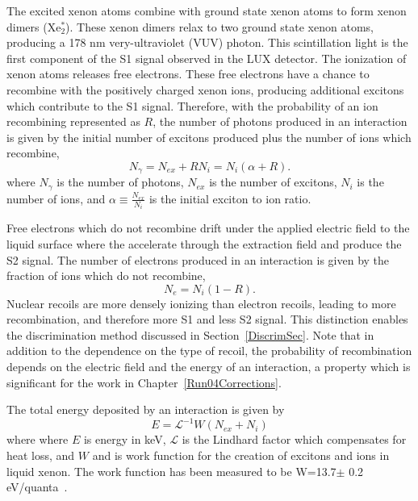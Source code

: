 The excited xenon atoms combine with ground state xenon atoms to form xenon dimers (Xe$^*_2$).  These xenon dimers relax to two ground state xenon atoms, producing a 178 nm very-ultraviolet (VUV) photon.  This scintillation light is the first component of the S1 signal observed in the LUX detector. The ionization of xenon atoms releases free electrons.  These free electrons have a chance to recombine with the positively charged xenon ions, producing additional excitons which contribute to the S1 signal. Therefore, with the probability of an ion recombining represented as $R$, the number of photons produced in an interaction is given by the initial number of excitons produced plus the number of ions which recombine,
\begin{equation}
N_\gamma = N_{ex} + R N_i = N_{i}  (\alpha + R).
\end{equation}
where $N_\gamma$ is the number of photons, $N_{ex}$ is the number of excitons, $N_i$ is the number of ions, and $\alpha \equiv \frac{N_{ex}}{N_i}$ is the initial exciton to ion ratio. 



Free electrons which do not recombine drift under the applied electric field to the liquid surface where the accelerate through the extraction field and produce the S2 signal.  The number of electrons produced in an interaction is given by the fraction of ions which do not recombine,
\begin{equation}
N_e = N_i(1-R).
\end{equation}
Nuclear recoils are more densely ionizing than electron recoils, leading to more recombination, and therefore more S1 and less S2 signal.  This distinction enables the discrimination method discussed in Section~\ref{DiscrimSec}.  Note that in addition to the dependence on the type of recoil, the probability of recombination depends on the electric field and the energy of an interaction, a property which is significant for the work in Chapter~\ref{Run04Corrections}.

The total energy deposited by an interaction is given by
\begin{equation} \label{EnergyOne}
E = \mathcal{L}^{-1} W (N_{ex} + N_i)
\end{equation}
where where $E$ is energy in keV, $\mathcal{L}$ is the Lindhard factor which compensates for heat loss, and $W$ and is work function for the creation of excitons and ions in liquid xenon. The work function has been measured to be  W=13.7$\pm$ 0.2 eV/quanta~\cite{Dahl}. 

